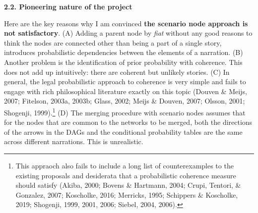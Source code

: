 \documentclass[11pt,dvipsnames,enabledeprecatedfontcommands]{scrartcl}
\begin{document}
\vspace{1mm}

\noindent \large \textbf{2.2. Pioneering nature of the project}

\vspace{1mm} \normalsize

Here are the key reasons why I am convinced
\textbf{the scenario node approach is not satisfactory}. (A) Adding a
parent node by \emph{fiat} without any good reasons to think the nodes
are connected other than being a part of a single story, introduces
probabilistic dependencies between the elements of a narration. (B)
Another problem is the identification of prior probability with
coherence. This does not add up intuitively: there are coherent but
unlikely stories. (C) In general, the legal probabilistic approach to
coherence is very simple and fails to engage with rich philosophical
literature exactly on this topic (Douven \& Meijs, 2007; Fitelson,
2003a, 2003b; Glass, 2002; Meijs \& Douven, 2007; Olsson, 2001;
Shogenji, 1999).\footnote{This appraoch also fails to include a long
  list of counterexamples to the existing proposals and desiderata that
  a probabilistic coherence measure should satisfy (Akiba, 2000; Bovens
  \& Hartmann, 2004; Crupi, Tentori, \& Gonzalez, 2007; Koscholke, 2016;
  Merricks, 1995; Schippers \& Koscholke, 2019; Shogenji, 1999, 2001,
  2006; Siebel, 2004, 2006).} (D) The merging procedure with scenario
nodes assumes that for the nodes that are common to the networks to be
merged, both the directions of the arrows in the DAGs and the
conditional probability tables are the same across different narrations.
This is unrealistic.
\end{document}
